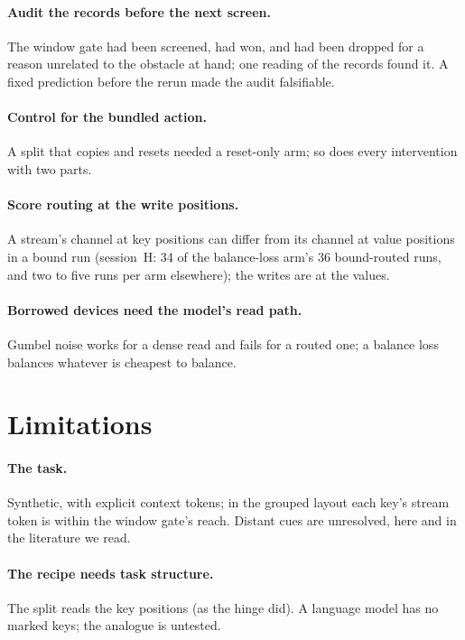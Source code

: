 \documentclass[11pt]{article}
\begin{document}
\paragraph{Audit the records before the next screen.} The window gate had been screened, had won, and had been dropped for a reason unrelated to the obstacle at hand; one reading of the records found it. A fixed prediction before the rerun made the audit falsifiable.

\paragraph{Control for the bundled action.} A split that copies and resets needed a reset-only arm; so does every intervention with two parts.

\paragraph{Score routing at the write positions.} A stream's channel at key positions can differ from its channel at value positions in a bound run (session~H: 34 of the balance-loss arm's 36 bound-routed runs, and two to five runs per arm elsewhere); the writes are at the values.

\paragraph{Borrowed devices need the model's read path.} Gumbel noise works for a dense read and fails for a routed one; a balance loss balances whatever is cheapest to balance.

\section{Limitations}

\paragraph{The task.} Synthetic, with explicit context tokens; in the grouped layout each key's stream token is within the window gate's reach. Distant cues are unresolved, here and in the literature we read.

\paragraph{The recipe needs task structure.} The split reads the key positions (as the hinge did). A language model has no marked keys; the analogue is untested.
\end{document}
